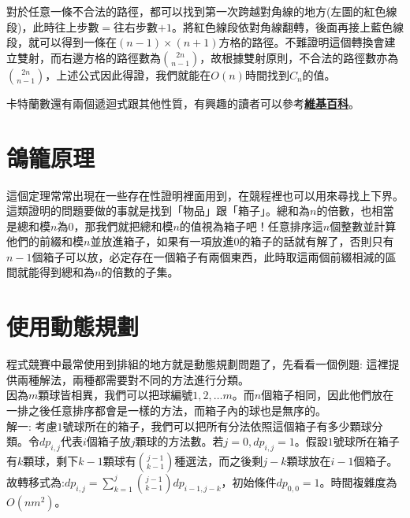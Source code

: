 對於任意一條不合法的路徑，都可以找到第一次跨越對角線的地方(左圖的紅色線段)，此時往上步數$=$往右步數$+1$。將紅色線段依對角線翻轉，後面再接上藍色線段，就可以得到一條在$(n-1)\times(n+1)$方格的路徑。不難證明這個轉換會建立雙射，而右邊方格的路徑數為$\binom{2n}{n-1}$，故根據雙射原則，不合法的路徑數亦為$\binom{2n}{n-1}$，上述公式因此得證，我們就能在$O(n)$時間找到$C_n$的值。

卡特蘭數還有兩個遞迴式跟其他性質，有興趣的讀者可以參考\textbf{\href{https://en.wikipedia.org/wiki/Catalan_number}{維基百科}}。

\section{鴿籠原理}
這個定理常常出現在一些存在性證明裡面用到，在競程裡也可以用來尋找上下界。
\newpage
這類證明的問題要做的事就是找到「物品」跟「箱子」。總和為$n$的倍數，也相當是總和模$n$為$0$，那我們就把總和模$n$的值視為箱子吧！任意排序這$n$個整數並計算他們的前綴和模$n$並放進箱子，如果有一項放進$0$的箱子的話就有解了，否則只有$n-1$個箱子可以放，必定存在一個箱子有兩個東西，此時取這兩個前綴相減的區間就能得到總和為$n$的倍數的子集。


\section{使用動態規劃}
程式競賽中最常使用到排組的地方就是動態規劃問題了，先看看一個例題:
這裡提供兩種解法，兩種都需要對不同的方法進行分類。 \\
因為$m$顆球皆相異，我們可以把球編號$1, 2, \dots m$。而$n$個箱子相同，因此他們放在一排之後任意排序都會是一樣的方法，而箱子內的球也是無序的。 \\

解一: 考慮$1$號球所在的箱子，我們可以把所有分法依照這個箱子有多少顆球分類。令$dp_{i, j}$代表$i$個箱子放$j$顆球的方法數。若$j = 0, dp_{i, j} = 1$。假設$1$號球所在箱子有$k$顆球，剩下$k-1$顆球有$\binom{j-1}{k-1}$種選法，而之後剩$j-k$顆球放在$i-1$個箱子。故轉移式為:$dp_{i, j} = \sum_{k=1}^j \binom{j-1}{k-1} dp_{i-1, j-k}$，初始條件$dp_{0, 0} = 1$。時間複雜度為$O(nm^2)$。\\

